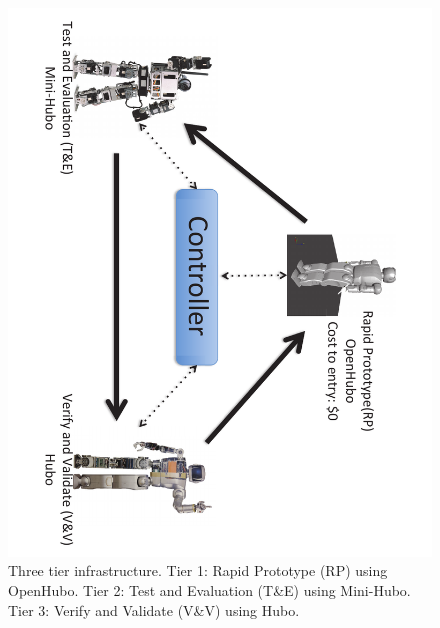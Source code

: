 \begin{figure}[thpb]
  \centering
\includegraphics[angle=90, width=0.8\columnwidth]{./pix/threeTier.pdf}
  \caption{Three tier infrastructure. Tier 1: Rapid Prototype (RP) using OpenHubo. Tier 2: Test and Evaluation (T\&E) using Mini-Hubo.  Tier 3: Verify and Validate (V\&V) using Hubo.}
  \label{fig:threeTier}
\end{figure}



